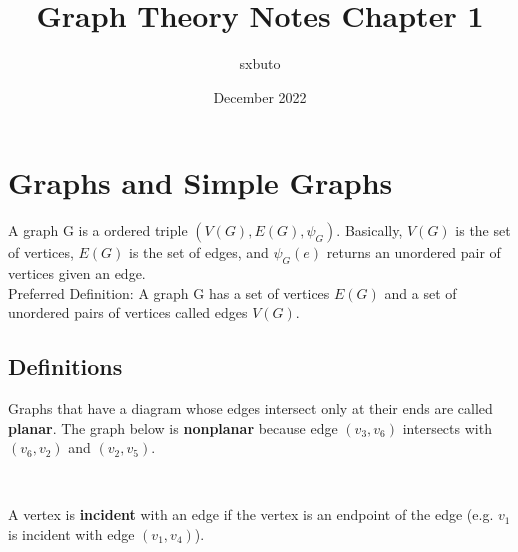 \documentclass{article}
\title{Graph Theory Notes Chapter 1}
\author{sxbuto}
\date{December 2022}
\begin{document}
\maketitle

\section{Graphs and Simple Graphs}
A graph G is a ordered triple $(V(G), E(G), \psi_G)$. Basically,
$V(G)$ is the set of vertices, $E(G)$ is the
set of edges, and $\psi_G(e)$ returns an unordered pair of
vertices given an edge.\\
Preferred Definition: A graph G has a set of vertices $E(G)$
and a set of unordered pairs of vertices called edges $V(G)$.\\
\subsection{Definitions}
Graphs that have a diagram whose edges intersect only at their ends are
called \textbf{planar}.
The graph below is \textbf{nonplanar} because edge $(v_3, v_6)$ intersects
with $(v_6, v_2)$ and $(v_2, v_5)$.\\
\begin{center}
    \\
\end{center}
A vertex is \textbf{incident} with an edge if the vertex is an endpoint
of the edge (e.g. $v_1$ is incident with edge $(v_1, v_4)$).
\end{document}
